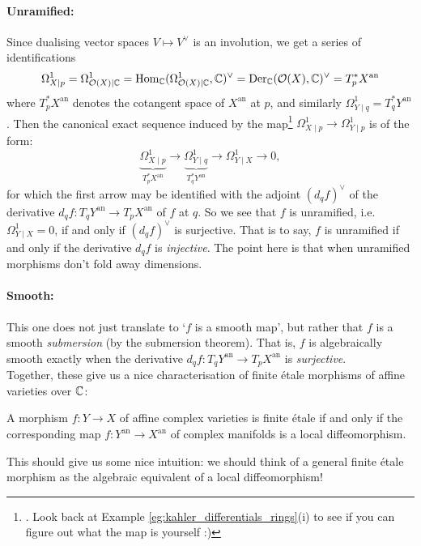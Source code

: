 \paragraph{Unramified:} Since dualising vector spaces $V \mapsto V^\vee$ is an involution, we get a series of identifications 
\[
	\Omega^1_{X \mid p} = \Omega^1_{\mathcal{O}(X) \mid \mathbb{C}} = \mathrm{Hom}_{\mathbb{C}}(\Omega^1_{\mathcal{O}(X) \mid \mathbb{C}}, \mathbb{C})^\vee = \mathrm{Der}_{\mathbb{C}}(\mathcal{O}(X), \mathbb{C})^\vee = T_p^* X^\text{an}
\] 
where $T_p^*X^\text{an}$ denotes the cotangent space of $X^\text{an}$ at $p$, and similarly $\Omega^1_{Y\mid q} = T_q^* Y^\text{an}$. Then the canonical exact sequence induced by the map\footnote{\Exc. Look back at Example \ref{eg:kahler_differentials_rings}(i) to see if you can figure out what the map is yourself :)} $\Omega^1_{X \mid p} \to \Omega^1_{Y \mid p}$ is of the form:
\[
	\underbrace{\Omega^1_{X \mid p}}_{T_p^*X^\text{an}} \longrightarrow \underbrace{\Omega^1_{Y \mid q}}_{T_q^*Y^\text{an}} \longrightarrow \Omega^1_{Y \mid X} \longrightarrow 0,
\]
for which the first arrow may be identified with the adjoint $(d_q f)^\vee$ of the derivative $d_q f : T_q Y^\text{an} \to T_p X^\text{an}$ of $f$ at $q$. So we see that $f$ is unramified, i.e. $\Omega^1_{Y \mid X} = 0$, if and only if $(d_qf)^\vee$ is surjective. That is to say, $f$ is unramified if and only if the derivative $d_q f$ is \emph{injective}. The point here is that when unramified morphisms don't fold away dimensions.

\paragraph{Smooth:} This one does not just translate to `$f$ is a smooth map', but rather that $f$ is a smooth \emph{submersion} (by the submersion theorem). That is, $f$ is algebraically smooth exactly when the derivative $d_q f : T_q Y^\text{an} \to T_p X^\text{an}$ is \emph{surjective}.\\


Together, these give us a nice characterisation of finite \'etale morphisms of affine varieties over $\mathbb{C}$:
\begin{thm}
	\label{thm:fet_maps_complex_varieties}
	A morphism $f: Y \to X$ of affine complex varieties is finite \'etale if and only if the corresponding map $f:Y^\text{an} \to X^\text{an}$ of complex manifolds is a local diffeomorphism.
\end{thm}

This should give us some nice intuition: we should think of a general finite \'etale morphism as the algebraic equivalent of a local diffeomorphism!


